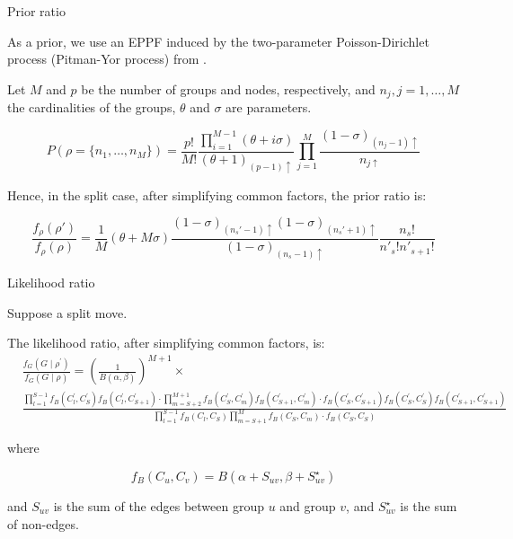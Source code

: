 \begin{frame}{Prior ratio}

As a prior, we use an EPPF induced by the \alert{two-parameter Poisson-Dirichlet} process (Pitman-Yor process) from \cite{martinezNonparametricChangePoint2014}.

Let $M$ and $p$ be the number of groups and nodes, respectively, and $n_{j},j=1,\ldots,M$ the cardinalities of the groups, $\theta$ and $\sigma$ are parameters.

\begin{equation*}
    P(\rho = \{n_1, \ldots, n_M\})
    =
    \frac{p!}{M!} \frac{ \prod_{i=1}^{M-1}{(\theta +i\sigma)} }{(\theta+1)_{(p-1)\uparrow}} \prod_{j=1}^{M}{\frac{(1-\sigma)_{(n_{j}-1)\uparrow}}{n_{j\uparrow}} }
\end{equation*}

Hence, in the split case, after simplifying common factors, the \alert{prior ratio} is:

\begin{equation*}
    \frac{f_{\rho}(\rho')}{f_{\rho}(\rho)}
    =
    \frac{1}{M}(\theta+M\sigma)\frac{(1-\sigma)_{(n_{s}'-1)\uparrow}(1-\sigma)_{(n_{s}'+1)\uparrow}}{(1-\sigma)_{(n_{s}-1)\uparrow}}\frac{n_{s}!}{n'_{s}!n'_{s+1}!}
\end{equation*}

\end{frame}

\begin{frame}{Likelihood ratio}

Suppose a split move.

The \alert{likelihood ratio}, after simplifying common factors, is:
{
    \footnotesize
    \begin{align*}
        & \frac{f_G(G \mid \rho^\prime)}{f_G(G \mid \rho)}=\left(\frac{1}{B(\alpha, \beta)}\right)^{M+1} \times \\
        & \frac{ \prod_{l=1}^{S-1} f_B(C_l^\prime, C_S^\prime) f_B(C_l^\prime, C_{S+1}^\prime) \cdot \prod_{m=S+2}^{M+1} f_B(C_S^\prime, C_m^\prime) f_B(C_{S+1}^\prime, C_m^\prime) \cdot f_B(C_S^\prime, C_{S+1}^\prime) f_B(C_S^\prime, C_S^\prime) f_B(C_{S+1}^\prime, C_{S+1}^\prime)}{\prod_{l=1}^{S-1} f_B(C_l, C_S) \prod_{m=S+1}^M f_B(C_S, C_m) \cdot f_B(C_S, C_S)} 
    \end{align*}
}

where

\[
    f_B(C_u, C_v) = B(\alpha+S_{uv},\beta+S^{\star}_{uv})
\]

and $S_{uv}$ is the sum of the edges between group $u$ and group $v$, and $S^{\star}_{uv}$ is the sum of non-edges.

\end{frame}
